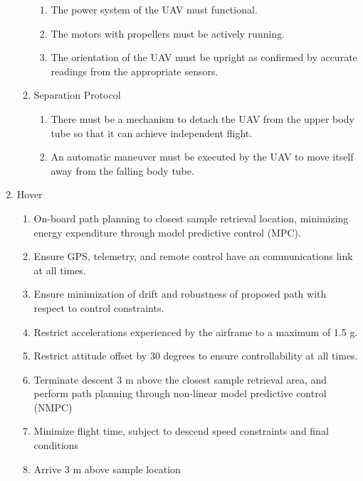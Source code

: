 \begin{enumerate}[noitemsep, label=\arabic*.]
\begin{enumerate}[noitemsep, label=1.\arabic*.]
\begin{enumerate}[noitemsep, label=1.4.\arabic*.]
			\item The power system of the UAV must functional.
			\item The motors with propellers must be actively running.
			\item The orientation of the UAV must be upright as confirmed by accurate readings from the appropriate sensors.
		\end{enumerate}
		\item Separation Protocol
		\begin{enumerate}[noitemsep, label=1.5.\arabic*.]
			\item There must be a mechanism to detach the UAV from the upper body tube so that it can achieve independent flight.
			\item An automatic maneuver must be executed by the UAV to move itself away from the falling body tube.
		\end{enumerate}
	\end{enumerate}
	\item Hover
	\begin{enumerate}[noitemsep, label=2.\arabic*.]
		\item On-board path planning to closest sample retrieval location, minimizing energy expenditure through model predictive control (MPC).
		\item Ensure GPS, telemetry, and remote control have an communications link at all times.
		\item Ensure minimization of drift and robustness of proposed path with respect to control constraints.
		\item Restrict accelerations experienced by the airframe to a maximum of 1.5 g.
		\item Restrict attitude offset by 30 degrees to ensure controllability at all times.
		\item Terminate descent 3 m above the closest sample retrieval area, and perform path planning through non-linear model predictive control (NMPC)
		\item Minimize flight time, subject to descend speed constraints and final conditions
		\item Arrive 3 m above sample location


\end{enumerate}
\end{enumerate}
